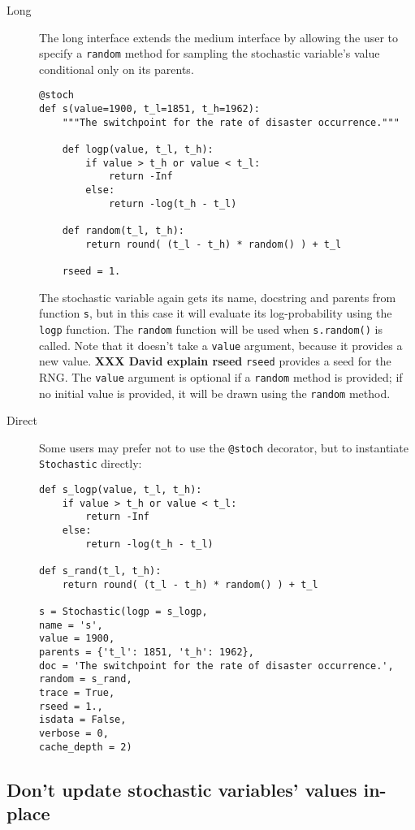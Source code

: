 \begin{description}
    \item[Long] The long interface extends the medium interface by allowing the user to specify a \texttt{random} method for sampling the stochastic variable's value conditional only on its parents.
    \begin{verbatim}
@stoch
def s(value=1900, t_l=1851, t_h=1962):
    """The switchpoint for the rate of disaster occurrence."""

    def logp(value, t_l, t_h):
        if value > t_h or value < t_l:
            return -Inf
        else:
            return -log(t_h - t_l) 
            
    def random(t_l, t_h):
        return round( (t_l - t_h) * random() ) + t_l

    rseed = 1.
    \end{verbatim}
The stochastic variable again gets its name, docstring and parents from function \texttt{s}, but in this case it will evaluate its log-probability using the \texttt{logp} function. The \texttt{random} function will be used when \texttt{s.random()} is called. Note that it doesn't take a \texttt{value} argument, because it provides a new value. \textbf{XXX David explain rseed} \texttt{rseed} provides a seed for the RNG. The \texttt{value} argument is optional if a \texttt{random} method is provided; if no initial value is provided, it will be drawn using the \texttt{random} method.

    \item[Direct] Some users may prefer not to use the \texttt{@stoch} decorator, but to instantiate \texttt{Stochastic} directly:
\begin{verbatim}
def s_logp(value, t_l, t_h):
    if value > t_h or value < t_l:
        return -Inf
    else:
        return -log(t_h - t_l) 

def s_rand(t_l, t_h):
    return round( (t_l - t_h) * random() ) + t_l

s = Stochastic(logp = s_logp, 
name = 's', 
value = 1900,
parents = {'t_l': 1851, 't_h': 1962},
doc = 'The switchpoint for the rate of disaster occurrence.',
random = s_rand, 
trace = True, 
rseed = 1., 
isdata = False,
verbose = 0,
cache_depth = 2)
\end{verbatim}
\end{description}

\subsection{Don't update stochastic variables' values in-place}\label{sub:warning}

